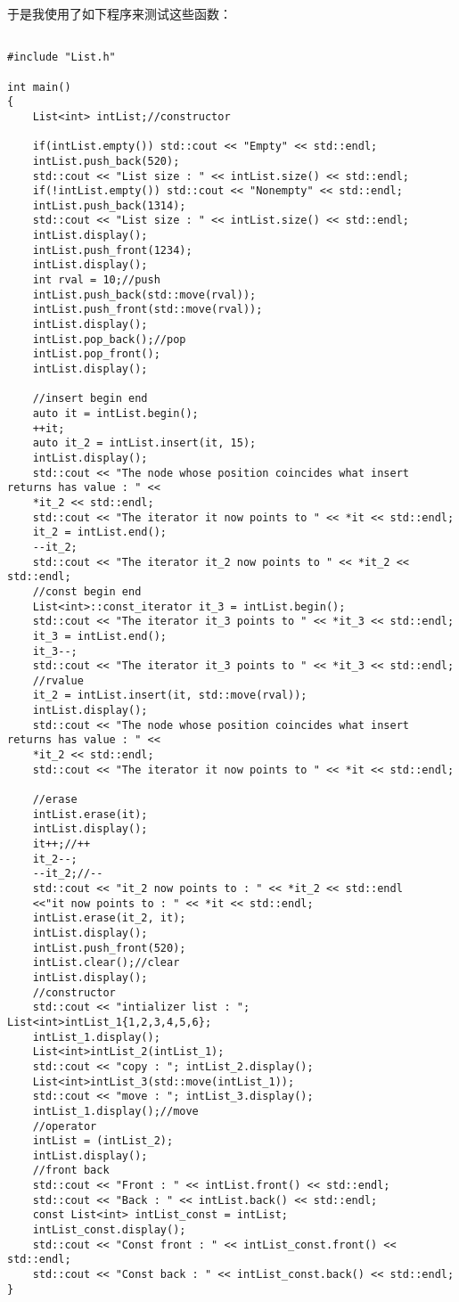 \documentclass[UTF8]{ctexart}
\begin{document}
于是我使用了如下程序来测试这些函数：
\begin{lstlisting}
    
#include "List.h"

int main()
{
    List<int> intList;//constructor
    
    if(intList.empty()) std::cout << "Empty" << std::endl;
    intList.push_back(520);
    std::cout << "List size : " << intList.size() << std::endl;
    if(!intList.empty()) std::cout << "Nonempty" << std::endl;
    intList.push_back(1314);
    std::cout << "List size : " << intList.size() << std::endl;
    intList.display();
    intList.push_front(1234);
    intList.display();
    int rval = 10;//push
    intList.push_back(std::move(rval));
    intList.push_front(std::move(rval));
    intList.display();
    intList.pop_back();//pop
    intList.pop_front();
    intList.display();

    //insert begin end
    auto it = intList.begin();
    ++it;
    auto it_2 = intList.insert(it, 15);
    intList.display();
    std::cout << "The node whose position coincides what insert returns has value : " << 
    *it_2 << std::endl;
    std::cout << "The iterator it now points to " << *it << std::endl;
    it_2 = intList.end();
    --it_2;
    std::cout << "The iterator it_2 now points to " << *it_2 << std::endl;
    //const begin end
    List<int>::const_iterator it_3 = intList.begin();
    std::cout << "The iterator it_3 points to " << *it_3 << std::endl;
    it_3 = intList.end();
    it_3--;
    std::cout << "The iterator it_3 points to " << *it_3 << std::endl;
    //rvalue
    it_2 = intList.insert(it, std::move(rval));
    intList.display(); 
    std::cout << "The node whose position coincides what insert returns has value : " << 
    *it_2 << std::endl;
    std::cout << "The iterator it now points to " << *it << std::endl;

    //erase
    intList.erase(it);
    intList.display();
    it++;//++
    it_2--;
    --it_2;//--
    std::cout << "it_2 now points to : " << *it_2 << std::endl
    <<"it now points to : " << *it << std::endl;
    intList.erase(it_2, it);
    intList.display();
    intList.push_front(520);
    intList.clear();//clear
    intList.display();
    //constructor
    std::cout << "intializer list : "; List<int>intList_1{1,2,3,4,5,6};
    intList_1.display();
    List<int>intList_2(intList_1);
    std::cout << "copy : "; intList_2.display();
    List<int>intList_3(std::move(intList_1));
    std::cout << "move : "; intList_3.display();
    intList_1.display();//move
    //operator
    intList = (intList_2);
    intList.display();
    //front back
    std::cout << "Front : " << intList.front() << std::endl;
    std::cout << "Back : " << intList.back() << std::endl;
    const List<int> intList_const = intList;
    intList_const.display();
    std::cout << "Const front : " << intList_const.front() << std::endl;
    std::cout << "Const back : " << intList_const.back() << std::endl;
}
\end{lstlisting}
\end{document}
